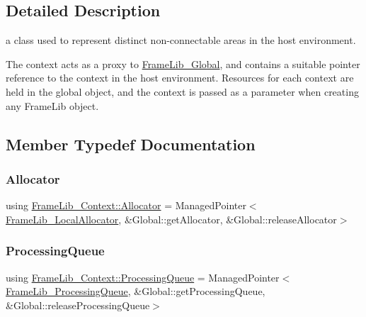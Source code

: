 \subsection{Detailed Description}
a class used to represent distinct non-\/connectable areas in the host environment. 

The context acts as a proxy to \hyperlink{class_frame_lib___global}{Frame\+Lib\+\_\+\+Global}, and contains a suitable pointer reference to the context in the host environment. Resources for each context are held in the global object, and the context is passed as a parameter when creating any Frame\+Lib object. 

\subsection{Member Typedef Documentation}
\mbox{\label{class_frame_lib___context_a5282f95b5825866bc4bb2aad500ccfa3}} 
\subsubsection{\texorpdfstring{Allocator}{Allocator}}
{\footnotesize\ttfamily using \hyperlink{class_frame_lib___context_a5282f95b5825866bc4bb2aad500ccfa3}{Frame\+Lib\+\_\+\+Context\+::\+Allocator} =  Managed\+Pointer$<$\hyperlink{class_frame_lib___local_allocator}{Frame\+Lib\+\_\+\+Local\+Allocator}, \&Global\+::get\+Allocator, \&Global\+::release\+Allocator$>$}

\mbox{\label{class_frame_lib___context_aa1c7f3c910b75dbc827a140e5ad33d12}} 
\subsubsection{\texorpdfstring{Processing\+Queue}{ProcessingQueue}}
{\footnotesize\ttfamily using \hyperlink{class_frame_lib___context_aa1c7f3c910b75dbc827a140e5ad33d12}{Frame\+Lib\+\_\+\+Context\+::\+Processing\+Queue} =  Managed\+Pointer$<$\hyperlink{class_frame_lib___processing_queue}{Frame\+Lib\+\_\+\+Processing\+Queue}, \&Global\+::get\+Processing\+Queue, \&Global\+::release\+Processing\+Queue$>$}



